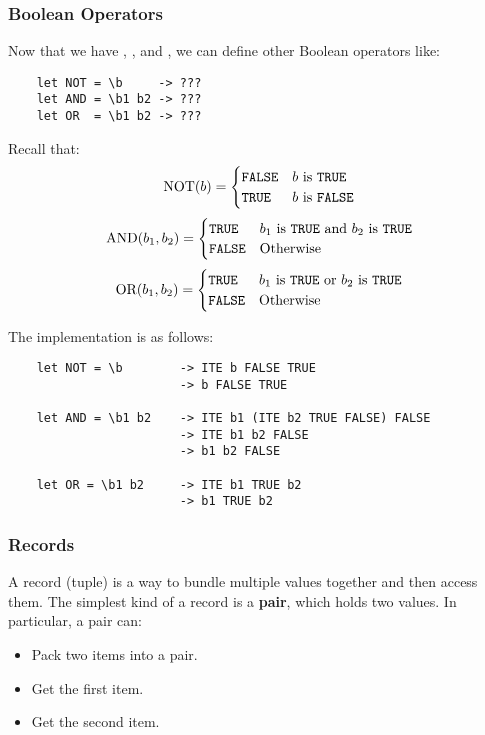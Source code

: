 \documentclass[letterpaper]{article}
\begin{document}
\subsubsection{Boolean Operators}
Now that we have , , and , we can define other Boolean operators like: 
\begin{verbatim}
    let NOT = \b     -> ??? 
    let AND = \b1 b2 -> ???
    let OR  = \b1 b2 -> ???
\end{verbatim}
Recall that: 
\[\text{NOT}(b) = \begin{cases}
    \texttt{FALSE} & b \text{ is \texttt{TRUE}} \\ 
    \texttt{TRUE} & b \text{ is \texttt{FALSE}}
\end{cases}\]
\[\text{AND}(b_1, b_2) = \begin{cases}
    \texttt{TRUE} & b_1 \text{ is \texttt{TRUE} and } b_2 \text{ is \texttt{TRUE}} \\ 
    \texttt{FALSE} & \text{Otherwise}
\end{cases}\]
\[\text{OR}(b_1, b_2) = \begin{cases}
    \texttt{TRUE} & b_1 \text{ is \texttt{TRUE} or } b_2 \text{ is \texttt{TRUE}} \\ 
    \texttt{FALSE} & \text{Otherwise}
\end{cases}\]

The implementation is as follows:
\begin{verbatim}
    let NOT = \b        -> ITE b FALSE TRUE 
                        -> b FALSE TRUE 

    let AND = \b1 b2    -> ITE b1 (ITE b2 TRUE FALSE) FALSE 
                        -> ITE b1 b2 FALSE
                        -> b1 b2 FALSE  

    let OR = \b1 b2     -> ITE b1 TRUE b2
                        -> b1 TRUE b2 
\end{verbatim}

\subsubsection{Records}
A record (tuple) is a way to bundle multiple values together and then access them. The simplest kind of a record is a \textbf{pair}, which holds two values. In particular, a pair can: 
\begin{itemize}
    \item Pack two items into a pair. 
    \item Get the first item. 
    \item Get the second item. 
\end{itemize}
\end{document}
